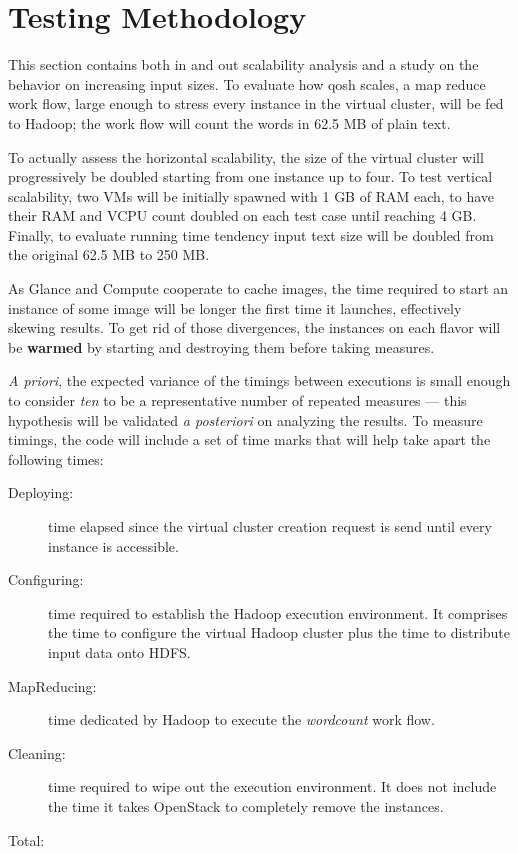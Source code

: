 \section{Testing Methodology}\label{sec:metodologiaprueba}
\noindent This section contains both in and out scalability analysis and a study on the behavior on increasing input sizes. To evaluate how qosh scales, a map reduce work flow, large enough to stress every instance in the virtual cluster, will be fed to Hadoop; the work flow will count the words in 62.5 MB of plain text.

To actually assess the horizontal scalability, the size of the virtual cluster will progressively be doubled starting from one instance up to four. To test vertical scalability, two VMs will be initially spawned with 1 GB of RAM each, to have their RAM and VCPU count doubled on each test case until reaching 4 GB. Finally, to evaluate running time tendency input text size will be doubled from the original 62.5 MB to 250 MB.

As Glance and Compute cooperate to cache images, the time required to start an instance of some image will be longer the first time it launches, effectively skewing results. To get rid of those divergences, the instances on each flavor will be \textbf{warmed} by starting and destroying them before taking measures.

\emph{A priori}, the expected variance of the timings between executions is small enough to consider \emph{ten} to be a representative number of repeated measures --- this hypothesis will be validated \emph{a posteriori} on analyzing the results. To measure timings, the code will include a set of time marks that will help take apart the following times:

\begin{description}
    \item[Deploying:] time elapsed since the virtual cluster creation request is send until every instance is accessible.
    \item[Configuring:] time required to establish the Hadoop execution environment. It comprises the time to configure the virtual Hadoop cluster plus the time to distribute input data onto HDFS.
    \item[MapReducing:] time dedicated by Hadoop to execute the \emph{wordcount} work flow.
    \item[Cleaning:] time required to wipe out the execution environment. It does not include the time it takes OpenStack to completely remove the instances.
    \item[Total:] 
\end{description}

